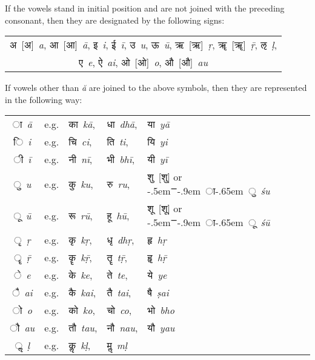 \documentclass{article}
\newcommand{\siddhanta}[1]{\mbox{\Siddhanta#1}}
\newcommand{\siddhantaII}[1]{\mbox{\SiddhantaII#1}}
\newcommand{\shu}{\siddhanta{{}\kern-.5em{ꣻ}\kern-.9em{ ा}\kern-.65em{ ु}}}
\newcommand{\shU}{\siddhanta{{}\kern-.5em{ꣻ}\kern-.9em{ ा}\kern-.65em{ ू}}}
\newcommand{\lingual}[1]{\textit{#1}}
\newcommand{\siddhantalingual}[2]{\siddhanta{#1}~\lingual{#2}}
\newcommand{\alt}[2]{#1~[#2]}
\newcommand{\siddhantasiddhantaII}[2]{\alt{\siddhanta{#1}}{\siddhantaII{#2}}}
\newcommand{\siddhantaIIsiddhanta}[2]{\alt{\siddhantaII{#1}}{\siddhanta{#2}}}
\newcommand{\siddhantaIIsiddhantalingual}[3]{\siddhantaIIsiddhanta{#1}{#2}~\lingual{#3}}
\begin{document}
If the vowels stand in initial position and are not joined with the preceding consonant, then they are designated by the following signs:\\
\begin{center}
	\def\arraystretch{1.5}
	\begin{tabular}{c}
		\siddhantaIIsiddhantalingual{अ}{अ}{a},
		\siddhantaIIsiddhantalingual{आ}{आ}{ā},
		\siddhantalingual{इ}{i},
		\siddhantalingual{ई}{ī},
		\siddhantalingual{उ}{u},
		\siddhantalingual{ऊ}{ū},
		\siddhantaIIsiddhantalingual{ऋ}{ऋ}{ṛ},
		\siddhantaIIsiddhantalingual{ॠ}{ॠ}{ṝ},
		\siddhantalingual{ऌ}{ḷ},\\
		\siddhantalingual{ए}{e},
		\siddhantalingual{ऐ}{ai},
		\siddhantaIIsiddhantalingual{ओ}{ओ}{o},
		\siddhantaIIsiddhantalingual{औ}{औ}{au}
	\end{tabular}
\end{center}

If vowels other than \lingual{ă} are joined to the above symbols, then they are represented in the following way:

\begin{center}
	\def\arraystretch{1.5}
	\begin{tabular}{cclll}
		\siddhantalingual{ा}{ā} & e.g. & \siddhantalingual{का}{kā}, & \siddhantalingual{धा}{dhā}, & \siddhantalingual{या}{yā}\\
		\siddhantalingual{ि}{i} & e.g. & \siddhantalingual{चि}{ci}, & \siddhantalingual{ति}{ti}, & \siddhantalingual{यि}{yi}\\
		\siddhantalingual{ी}{ī} & e.g. & \siddhantalingual{नी}{nī}, & \siddhantalingual{भी}{bhī}, & \siddhantalingual{यी}{yī}\\
		\siddhantalingual{ु}{u} & e.g. & \siddhantalingual{कु}{ku}, & \siddhantalingual{रु}{ru}, & \siddhantasiddhantaII{शु}{शु} or \shu{}~\lingual{śu}\\
		\siddhantalingual{ू}{ū} & e.g. & \siddhantalingual{रू}{rū}, & \siddhantalingual{हू}{hū}, & \siddhantasiddhantaII{शू}{शू} or \shU{}~\lingual{śū}\\
		\siddhantalingual{ृ}{ṛ} & e.g. & \siddhantalingual{कृ}{kṛ}, & \siddhantalingual{धृ}{dhṛ}, & \siddhantalingual{हृ}{hṛ}\\
		\siddhantalingual{ॄ}{ṝ} & e.g. & \siddhantalingual{कॄ}{kṝ}, & \siddhantalingual{तॄ}{tṝ}, & \siddhantalingual{हॄ}{hṝ}\\
		\siddhantalingual{े}{e} & e.g. & \siddhantalingual{के}{ke}, & \siddhantalingual{ते}{te}, & \siddhantalingual{ये}{ye}\\
		\siddhantalingual{ै}{ai} & e.g. & \siddhantalingual{कै}{kai}, & \siddhantalingual{तै}{tai}, & \siddhantalingual{षै}{ṣai}\\
		\siddhantalingual{ो}{o} & e.g. & \siddhantalingual{को}{ko}, & \siddhantalingual{चो}{co}, & \siddhantalingual{भो}{bho}\\
		\siddhantalingual{ौ}{au} & e.g. & \siddhantalingual{तौ}{tau}, & \siddhantalingual{नौ}{nau}, & \siddhantalingual{यौ}{yau}\\
		\siddhantalingual{ॢ}{ḷ} & e.g. & \siddhantalingual{कॢ}{kḷ}, & \siddhantalingual{मॢ}{mḷ} & \\
	\end{tabular}
\end{center}
\end{document}
